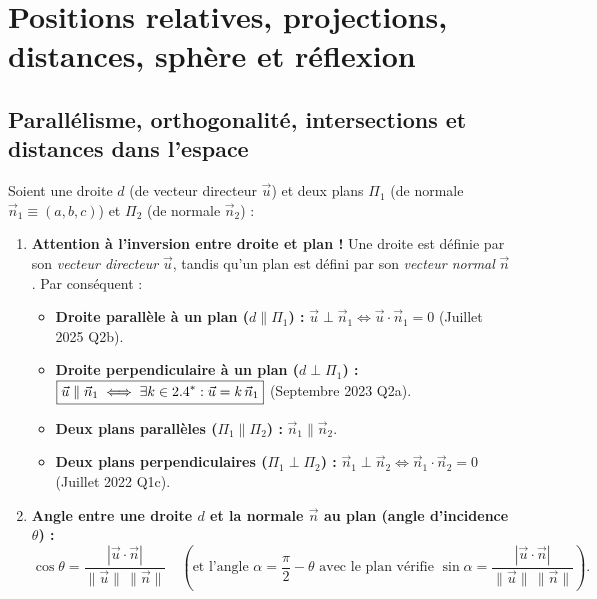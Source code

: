 \section{Positions relatives, projections, distances, sphère et réflexion}

\subsection{Parallélisme, orthogonalité, intersections et distances dans l'espace}

\begin{theoreme}
Soient une droite $d$ (de vecteur directeur $\vec{u}$) et deux plans $\Pi_1$ (de normale $\vec{n}_1 \equiv (a,b,c)$) et $\Pi_2$ (de normale $\vec{n}_2$) :
\begin{enumerate}
    \item \textbf{Attention à l'inversion entre droite et plan !} Une droite est définie par son \emph{vecteur directeur} $\vec{u}$, tandis qu'un plan est défini par son \emph{vecteur normal} $\vec{n}$. Par conséquent :
    \begin{itemize}
        \item \textbf{Droite parallèle à un plan ($d \parallel \Pi_1$) :} $\boxed{\vec{u} \perp \vec{n}_1 \iff \vec{u} \cdot \vec{n}_1 = 0}$ \quad (Juillet 2025 Q2b).
        \item \textbf{Droite perpendiculaire à un plan ($d \perp \Pi_1$) :} $\boxed{\vec{u} \parallel \vec{n}_1 \iff \exists k \in 2.4^* : \vec{u} = k\,\vec{n}_1}$ \quad (Septembre 2023 Q2a).
        \item \textbf{Deux plans parallèles ($\Pi_1 \parallel \Pi_2$) :} $\vec{n}_1 \parallel \vec{n}_2$.
        \item \textbf{Deux plans perpendiculaires ($\Pi_1 \perp \Pi_2$) :} $\boxed{\vec{n}_1 \perp \vec{n}_2 \iff \vec{n}_1 \cdot \vec{n}_2 = 0}$ \quad (Juillet 2022 Q1c).
    \end{itemize}
    \item \textbf{Angle entre une droite $d$ et la normale $\vec{n}$ au plan (angle d'incidence $\theta$) :}
    \[
        \cos\theta = \frac{|\vec{u} \cdot \vec{n}|}{\|\vec{u}\|\,\|\vec{n}\|} \quad \left(\text{et l'angle $\alpha = \frac{\pi}{2}-\theta$ avec le plan vérifie } \sin\alpha = \frac{|\vec{u}\cdot\vec{n}|}{\|\vec{u}\|\,\|\vec{n}\|}\right).
\]
\end{enumerate}
\end{theoreme}
